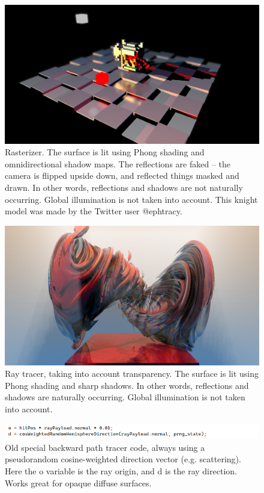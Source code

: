 \documentclass[12pt]{article}
\begin{document}
\begin{figure} 
\centering
  \includegraphics[width = 6 in]{fig1.png}
  \caption{ Rasterizer.
The surface is lit using Phong shading and omnidirectional shadow maps.
The reflections are faked -- the camera is flipped upside down, and reflected things masked and drawn.
In other words, reflections and shadows are not naturally occurring.
Global illumination is not taken into account.
This knight model was made by the Twitter user @ephtracy.
}

\end{figure}






\begin{figure} 
\centering
  \includegraphics[width = 6 in]{fig2.png}
  \caption{ Ray tracer, taking into account transparency.
The surface is lit using Phong shading and sharp shadows.
In other words, reflections and shadows are naturally occurring.
Global illumination is not taken into account.
}
\end{figure}




\begin{figure} 
\centering
  \includegraphics[width = 6 in]{fig3.png}
  \caption{ Old special backward path tracer code, always using a pseudorandom cosine-weighted direction vector (e.g. scattering).
Here the o variable is the ray origin, and d is the ray direction.
Works great for opaque diffuse surfaces.
}
\end{figure}
\end{document}
